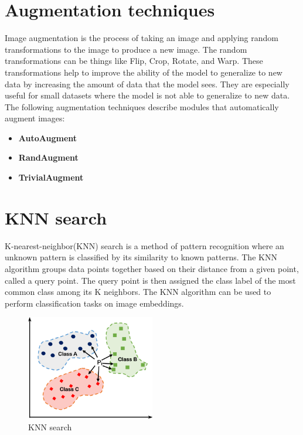 \documentclass[12pt,a4paper]{report}
\begin{document}
\section{Augmentation techniques}
Image augmentation is the process of taking an image and applying random transformations to the image to produce a new image.
The random transformations can be things like Flip, Crop, Rotate, and Warp.
These transformations help to improve the ability of the model to generalize to new data by increasing the amount of data that the model sees.
They are especially useful for small datasets where the model is not able to generalize to new data.
The following augmentation techniques describe modules that automatically augment images:
\begin{itemize}
	\item \textbf{AutoAugment} \cite{AutoAugment}
 	\item \textbf{RandAugment} \cite{RandAugment}
  	\item \textbf{TrivialAugment} \cite{TrivialAugmentWide}
\end{itemize}

\section{KNN search}
K-nearest-neighbor(KNN) search is a method of pattern recognition where an unknown pattern is classified by its similarity to known patterns.
The KNN algorithm groups data points together based on their distance from a given point, called a query point.
The query point is then assigned the class label of the most common class among its K neighbors.
The KNN algorithm can be used to perform classification tasks on image embeddings.


\begin{figure}[h]
    \centering
    \includegraphics[width=0.5\textwidth]{./images/knn.png}
	\caption{KNN search}
\end{figure}
\end{document}
